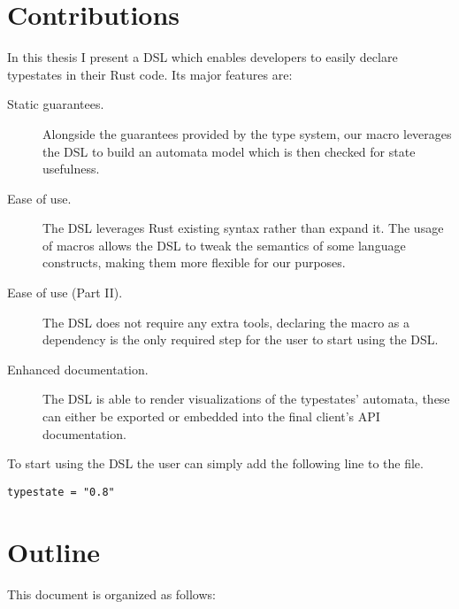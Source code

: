 \section{Contributions}\label{sec:objectives}

In this thesis I present a \gls{DSL} which enables developers to easily declare typestates in their Rust code.
Its major features are:

\begin{description}
    \item[Static guarantees.] Alongside the guarantees provided by the type system,
    our macro leverages the \gls{DSL} to build an automata model which is then checked for state usefulness.
    \item[Ease of use.] The \gls{DSL} leverages Rust existing syntax rather than expand it.
    The usage of macros allows the \gls{DSL} to tweak the semantics of some language constructs,
    making them more flexible for our purposes.
    \item[Ease of use (Part II).] The \gls{DSL} does not require any extra tools,
    declaring the macro as a dependency is the only required step for the user to start using the \gls{DSL}.
    \item[Enhanced documentation.] The \gls{DSL} is able to render visualizations of the typestates' automata,
    these can either be exported or embedded into the final client's \gls{API} documentation.
\end{description}
To start using the DSL the user can simply add the following line to the  file.
\begin{verbatim}
typestate = "0.8"
\end{verbatim}

\section{Outline}\label{sec:organization}

This document is organized as follows:

